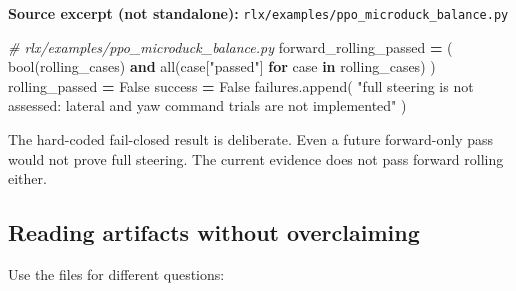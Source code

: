 \documentclass[
  american,
  11pt,
  letterpaper,
]{article}
\newenvironment{Shaded}{\begin{snugshade}}{\end{snugshade}}
\newcommand{\BuiltInTok}[1]{#1}
\newcommand{\CommentTok}[1]{\textcolor[rgb]{0.56,0.35,0.01}{\textit{#1}}}
\newcommand{\ControlFlowTok}[1]{\textcolor[rgb]{0.13,0.29,0.53}{\textbf{#1}}}
\newcommand{\KeywordTok}[1]{\textcolor[rgb]{0.13,0.29,0.53}{\textbf{#1}}}
\newcommand{\NormalTok}[1]{#1}
\newcommand{\OperatorTok}[1]{\textcolor[rgb]{0.81,0.36,0.00}{\textbf{#1}}}
\newcommand{\StringTok}[1]{\textcolor[rgb]{0.31,0.60,0.02}{#1}}
\newcommand{\VariableTok}[1]{\textcolor[rgb]{0.00,0.00,0.00}{#1}}
\renewenvironment{Shaded}{\par\smallskip}{\par\smallskip}
\begin{document}
\textbf{Source excerpt (not standalone):}
\texttt{rlx/\allowbreak{}examples\allowbreak{}/\allowbreak{}ppo\_\allowbreak{}microduc\allowbreak{}k\_\allowbreak{}balance.\allowbreak{}py}

\begin{Shaded}
\begin{Highlighting}[]
\CommentTok{\# rlx/examples/ppo\_microduck\_balance.py}
\NormalTok{forward\_rolling\_passed }\OperatorTok{=}\NormalTok{ (}
    \BuiltInTok{bool}\NormalTok{(rolling\_cases) }\KeywordTok{and} \BuiltInTok{all}\NormalTok{(case[}\StringTok{"passed"}\NormalTok{] }\ControlFlowTok{for}\NormalTok{ case }\KeywordTok{in}\NormalTok{ rolling\_cases)}
\NormalTok{)}
\NormalTok{rolling\_passed }\OperatorTok{=} \VariableTok{False}
\NormalTok{success }\OperatorTok{=} \VariableTok{False}
\NormalTok{failures.append(}
    \StringTok{"full steering is not assessed: lateral and yaw command trials are not implemented"}
\NormalTok{)}
\end{Highlighting}
\end{Shaded}

The hard-coded fail-closed result is deliberate. Even a future
forward-only pass would not prove full steering. The current evidence
does not pass forward rolling either.

\subsection{Reading artifacts without
overclaiming}\label{reading-artifacts-without-overclaiming}

Use the files for different questions:
\end{document}
